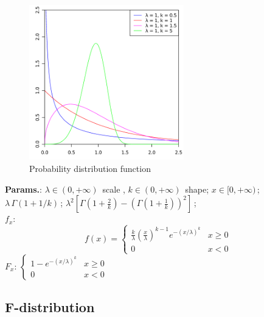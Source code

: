     \begin{figure}[H]
        \centering
        \includegraphics[width=0.6\textwidth]{images/Weibull PDF.png}
        \caption{Probability distribution function}
    \end{figure}




    {\color{darkblue} \textbf{Params.}:} {$\lambda\in (0, +\infty)\,$ scale ,  $k\in (0, +\infty)\,$ shape}; {$x \in [0, +\infty)\,$}; {$\lambda \, \Gamma(1+1/k)\,$}; {$\lambda^2\left[\Gamma\left(1+\frac{2}{k}\right) - \left(\Gamma\left(1+\frac{1}{k}\right)\right)^2\right]\,$};\hspace{0.5cm}\\{\color{darkblue} \textbf{$f_x$}:} {$$f(x)=\begin{cases}
\frac{k}{\lambda}\left(\frac{x}{\lambda}\right)^{k-1}e^{-(x/\lambda)^k} & x\geq0\\
0 & x<0\end{cases}$$}{\color{darkblue} \textbf{$F_x$}:} {$\begin{cases}1- e^{-(x/\lambda)^k} & x\geq0\\ 0 & x<0\end{cases}$}



    
        
\subsection{F-distribution}


